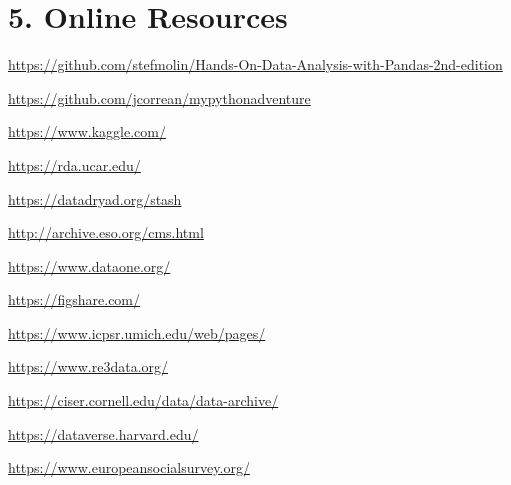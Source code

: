 \documentclass[letterpaper,11pt]{article}
\begin{document}
\section{5. Online Resources}
\textcolor{blue}{\url{https://github.com/stefmolin/Hands-On-Data-Analysis-with-Pandas-2nd-edition}}

\textcolor{blue}{\url{https://github.com/jcorrean/mypythonadventure}}

\textcolor{blue}{\url{https://www.kaggle.com/}}

\textcolor{blue}{\url{https://rda.ucar.edu/}}

\textcolor{blue}{\url{https://datadryad.org/stash}}

\textcolor{blue}{\url{http://archive.eso.org/cms.html}}

\textcolor{blue}{\url{https://www.dataone.org/}}

\textcolor{blue}{\url{https://figshare.com/}}

\textcolor{blue}{\url{https://www.icpsr.umich.edu/web/pages/}}

\textcolor{blue}{\url{https://www.re3data.org/}}

\textcolor{blue}{\url{https://ciser.cornell.edu/data/data-archive/}}

\textcolor{blue}{\url{https://dataverse.harvard.edu/}}

\textcolor{blue}{\url{https://www.europeansocialsurvey.org/}}

% 
% 
\end{document}
